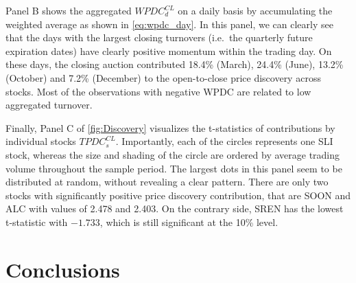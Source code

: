 \documentclass[11pt,a4paper]{article}
\begin{document}
    Panel B shows the aggregated $WPDC^{CL}_d$ on a daily basis by accumulating the weighted average as shown in \cref{eq:wpdc_day}. In this panel, we can clearly see that the days with the largest closing turnovers (i.e.\ the quarterly future expiration dates) have clearly positive momentum within the trading day. On these days, the closing auction contributed 18.4\% (March), 24.4\% (June), 13.2\% (October) and 7.2\% (December) to the open-to-close price discovery across stocks. Most of the observations with negative WPDC are related to low aggregated turnover.

    Finally, Panel C of \cref{fig:Discovery} visualizes the t-statistics of contributions by individual stocks $TPDC^{CL}_s$. Importantly, each of the circles represents one SLI stock, whereas the size and shading of the circle are ordered by average trading volume throughout the sample period. The largest dots in this panel seem to be distributed at random, without revealing a clear pattern. There are only two stocks with significantly positive price discovery contribution, that are SOON and ALC with values of 2.478 and 2.403. On the contrary side, SREN has the lowest t-statistic with $-1.733$, which is still significant at the 10\% level.


    \clearpage


    \section{Conclusions} \label{sec:Conclusion}
\end{document}
